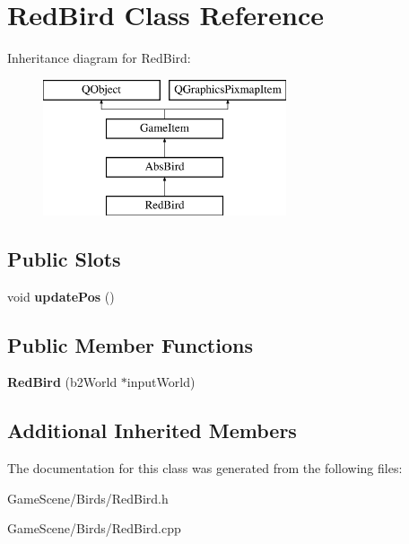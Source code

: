 \hypertarget{classRedBird}{}\section{Red\+Bird Class Reference}
\label{classRedBird}
Inheritance diagram for Red\+Bird\+:\begin{figure}[H]
\begin{center}
\leavevmode
\includegraphics[height=4.000000cm]{classRedBird}
\end{center}
\end{figure}
\subsection*{Public Slots}
\begin{DoxyCompactItemize}
\item 
void {\bfseries update\+Pos} ()\hypertarget{classRedBird_abe6174521033b4aaf65d9ce66aaad0e6}{}\label{classRedBird_abe6174521033b4aaf65d9ce66aaad0e6}

\end{DoxyCompactItemize}
\subsection*{Public Member Functions}
\begin{DoxyCompactItemize}
\item 
{\bfseries Red\+Bird} (b2\+World $\ast$input\+World)\hypertarget{classRedBird_a4ce50ed34a0e94554a49b043060266e6}{}\label{classRedBird_a4ce50ed34a0e94554a49b043060266e6}

\end{DoxyCompactItemize}
\subsection*{Additional Inherited Members}


The documentation for this class was generated from the following files\+:\begin{DoxyCompactItemize}
\item 
Game\+Scene/\+Birds/Red\+Bird.\+h\item 
Game\+Scene/\+Birds/Red\+Bird.\+cpp\end{DoxyCompactItemize}
